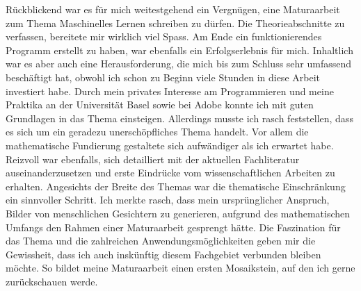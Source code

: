 Rückblickend war es für mich weitestgehend ein Vergnügen, eine Maturaarbeit zum
Thema Maschinelles Lernen schreiben zu dürfen. Die Theorieabschnitte zu
verfassen, bereitete mir wirklich viel Spass. Am Ende ein funktionierendes
Programm erstellt zu haben, war ebenfalls ein Erfolgserlebnis für mich.
Inhaltlich war es aber auch eine Herausforderung, die mich bis
zum Schluss sehr umfassend beschäftigt hat, obwohl ich schon zu Beginn viele
Stunden in diese Arbeit investiert habe. Durch mein privates Interesse am
Programmieren und meine Praktika an der Universität Basel sowie bei Adobe konnte
ich mit guten Grundlagen in das Thema einsteigen. Allerdings musste ich rasch
feststellen, dass es sich um ein geradezu unerschöpfliches Thema handelt. Vor
allem die mathematische Fundierung gestaltete sich aufwändiger als ich erwartet
habe.
\para{}
Reizvoll war ebenfalls, sich detailliert mit der aktuellen Fachliteratur
auseinanderzusetzen und erste Eindrücke vom wissenschaftlichen Arbeiten zu
erhalten. Angesichts der Breite des Themas war die thematische Einschränkung ein
sinnvoller Schritt. Ich merkte rasch, dass mein ursprünglicher Anspruch, Bilder
von menschlichen Gesichtern zu generieren, aufgrund des mathematischen Umfangs
den Rahmen einer Maturaarbeit gesprengt hätte.
\para{}
Die Faszination für das Thema und die zahlreichen
Anwendungsmöglichkeiten geben mir die Gewissheit, dass ich auch inskünftig
diesem Fachgebiet verbunden bleiben möchte. So bildet meine Maturaarbeit einen
ersten Mosaikstein, auf den ich gerne zurückschauen werde.


